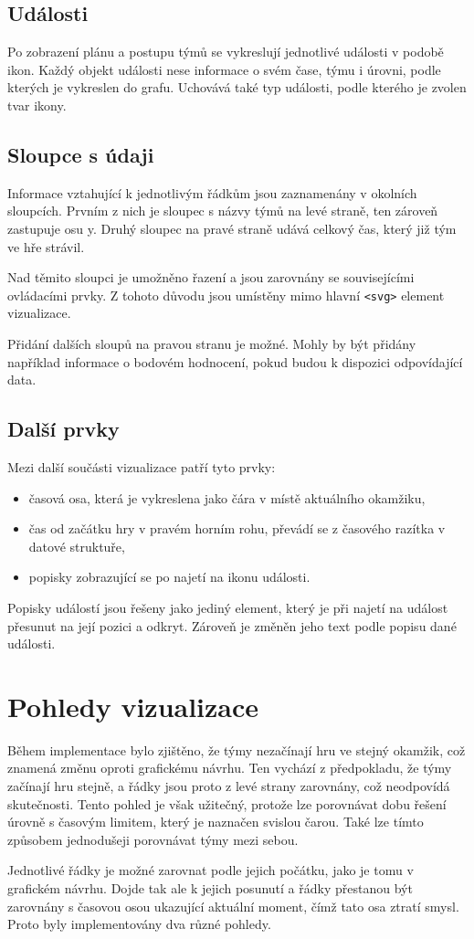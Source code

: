 \documentclass[
  digital, %
  oneside, %
  table,   %
  nolof,     %
  nolot,     %
]{fithesis3}
\begin{document}
\subsection{Události}
Po zobrazení plánu a postupu týmů se vykreslují jednotlivé události v podobě ikon. Každý objekt události nese informace o svém čase, týmu i úrovni, podle kterých je vykreslen do grafu. Uchovává také typ události, podle kterého je zvolen tvar ikony.
\subsection{Sloupce s údaji}
Informace vztahující k jednotlivým řádkům jsou zaznamenány v okolních sloupcích. Prvním z nich je sloupec s názvy týmů na levé straně, ten zároveň zastupuje osu y. Druhý sloupec na pravé straně udává celkový čas, který již tým ve hře strávil.\par
Nad těmito sloupci je umožněno řazení a jsou zarovnány se souvisejícími ovládacími prvky. Z tohoto důvodu jsou umístěny mimo hlavní \verb|<svg>| element vizualizace.\par
Přidání dalších sloupů na pravou stranu je možné. Mohly by být přidány například informace o bodovém hodnocení, pokud budou k dispozici odpovídající data.
\subsection{Další prvky}
Mezi další součásti vizualizace patří tyto prvky:
\begin{itemize}
  \item časová osa, která je vykreslena jako čára v místě aktuálního okamžiku,
  \item čas od začátku hry v pravém horním rohu, převádí se z časového razítka v datové struktuře,
  \item popisky zobrazující se po najetí na ikonu události.
\end{itemize}
Popisky událostí jsou řešeny jako jediný element, který je při najetí na událost přesunut na její pozici a odkryt. Zároveň je změněn jeho text podle popisu dané události.

\section{Pohledy vizualizace}
Během implementace bylo zjištěno, že týmy nezačínají hru ve stejný okamžik, což znamená změnu oproti grafickému návrhu. Ten vychází z předpokladu, že týmy začínají hru stejně, a řádky jsou proto z levé strany zarovnány, což neodpovídá skutečnosti. Tento pohled je však užitečný, protože lze porovnávat dobu řešení úrovně s časovým limitem, který je naznačen svislou čarou. Také lze tímto způsobem jednodušeji porovnávat týmy mezi sebou.\par
Jednotlivé řádky je možné zarovnat podle jejich počátku, jako je tomu v grafickém návrhu. Dojde tak ale k jejich posunutí a řádky přestanou být zarovnány s časovou osou ukazující aktuální moment, čímž tato osa ztratí smysl. Proto byly implementovány dva různé pohledy.
\end{document}
